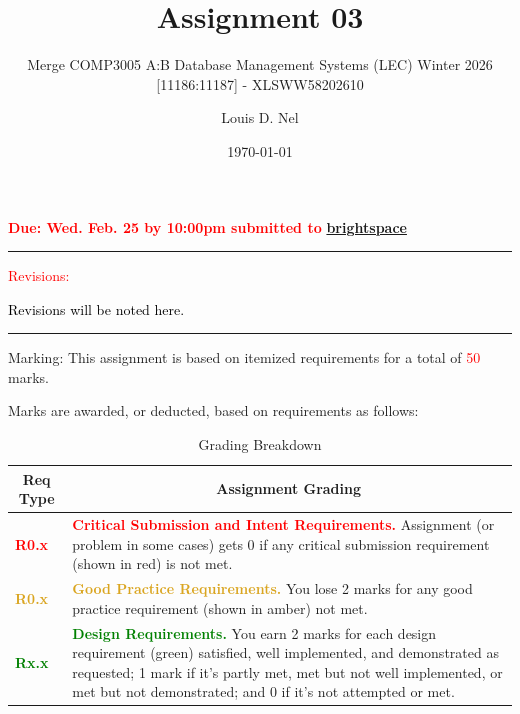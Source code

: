 \documentclass[12pt]{article}
\title{Assignment 03}
\subtitle{Merge COMP3005 A:B Database Management Systems (LEC) Winter 2026 [11186:11187] - XLSWW58202610}
\author{Louis D. Nel}
\date{\today}
\begin{document}
\maketitle
\thispagestyle{empty}

{
    \textcolor{red}{\bfseries Due: Wed. Feb. 25 by 10:00pm submitted to} \textcolor{blue}{\href{https://brightspace.carleton.ca/}{\textbf{brightspace}}} \par
    \textcolor{black}{\hrule} \par
    \textcolor{red}{\normalsize Revisions:} \par
    \textcolor{black}{Revisions will be noted here.} \par
    \textcolor{black}{\hrule} \par
     \vspace{0.25cm}
}

Marking: This assignment is based on itemized requirements for a total of \textcolor{red}{50} marks.

Marks are awarded, or deducted, based on requirements as follows:
\begin{table}[H]
    \renewcommand{\arraystretch}{1.5}
    \begin{center}
        \setlength{\tabcolsep}{15pt}
        \begin{longtable}{|@{}p{}@{}|@{}p{}@{}|}
            \hline
            \multicolumn{1}{|c|}{\textbf{Req Type}} & \multicolumn{1}{|c|}{\textbf{Assignment Grading}} \\
            \hline
            \textcolor{red}{\textbf{R0.x}}       & \textcolor{red}{\textbf{Critical Submission and Intent Requirements.}} Assignment (or problem in some cases) gets 0 if any critical submission requirement (shown in red) is not met. \\
            \hline
            \textcolor{goldenrod}{\textbf{R0.x}} & \textcolor{goldenrod}{\textbf{Good Practice Requirements.}} You lose 2 marks for any good practice requirement (shown in amber) not met. \\
            \hline
            \textcolor{green}{\textbf{Rx.x}}     & \textcolor{green}{\textbf{Design Requirements.}} You earn 2 marks for each design requirement (green) satisfied, well implemented, and demonstrated as requested; 1 mark if it's partly met, met but not well implemented, or met but not demonstrated; and 0 if it's not attempted or met. \\
            \hline
        \end{longtable}
    \end{center}
    \caption{Grading Breakdown}
\end{table}
\end{document}
